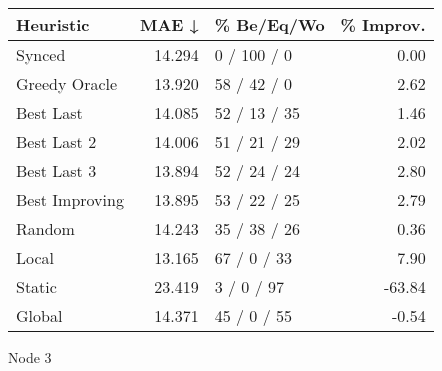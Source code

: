 \begin{tabular}{lrlr}
\toprule
\textbf{Heuristic} & \textbf{MAE ↓} & \textbf{\% Be/Eq/Wo} & \textbf{\% Improv.} \\
\midrule
            Synced &         14.294 &          0 / 100 / 0 &                0.00 \\
     Greedy Oracle &         13.920 &          58 / 42 / 0 &                2.62 \\
         Best Last &         14.085 &         52 / 13 / 35 &                1.46 \\
       Best Last 2 &         14.006 &         51 / 21 / 29 &                2.02 \\
       Best Last 3 &         13.894 &         52 / 24 / 24 &                2.80 \\
    Best Improving &         13.895 &         53 / 22 / 25 &                2.79 \\
            Random &         14.243 &         35 / 38 / 26 &                0.36 \\
             Local &         13.165 &          67 / 0 / 33 &                7.90 \\
            Static &         23.419 &           3 / 0 / 97 &              -63.84 \\
            Global &         14.371 &          45 / 0 / 55 &               -0.54 \\
\bottomrule
\end{tabular}
\caption{Node 3}
\label{tab:iid_lr01_le1_bs2_3}
